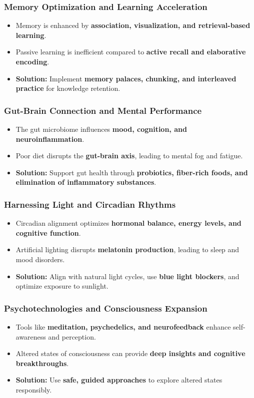 \begin{frame}[fragile]\frametitle{Memory Optimization and Learning Acceleration}
	\begin{itemize}
	\item Memory is enhanced by \textbf{association, visualization, and retrieval-based learning}.
	\item Passive learning is inefficient compared to \textbf{active recall and elaborative encoding}.
	\item \textbf{Solution:} Implement \textbf{memory palaces, chunking, and interleaved practice} for knowledge retention.
	\end{itemize}
\end{frame}

\begin{frame}[fragile]\frametitle{Gut-Brain Connection and Mental Performance}
	\begin{itemize}
	\item The gut microbiome influences \textbf{mood, cognition, and neuroinflammation}.
	\item Poor diet disrupts the \textbf{gut-brain axis}, leading to mental fog and fatigue.
	\item \textbf{Solution:} Support gut health through \textbf{probiotics, fiber-rich foods, and elimination of inflammatory substances}.
	\end{itemize}
\end{frame}

\begin{frame}[fragile]\frametitle{Harnessing Light and Circadian Rhythms}
	\begin{itemize}
	\item Circadian alignment optimizes \textbf{hormonal balance, energy levels, and cognitive function}.
	\item Artificial lighting disrupts \textbf{melatonin production}, leading to sleep and mood disorders.
	\item \textbf{Solution:} Align with natural light cycles, use \textbf{blue light blockers}, and optimize exposure to sunlight.
	\end{itemize}
\end{frame}

\begin{frame}[fragile]\frametitle{Psychotechnologies and Consciousness Expansion}
	\begin{itemize}
	\item Tools like \textbf{meditation, psychedelics, and neurofeedback} enhance self-awareness and perception.
	\item Altered states of consciousness can provide \textbf{deep insights and cognitive breakthroughs}.
	\item \textbf{Solution:} Use \textbf{safe, guided approaches} to explore altered states responsibly.
	\end{itemize}
\end{frame}

